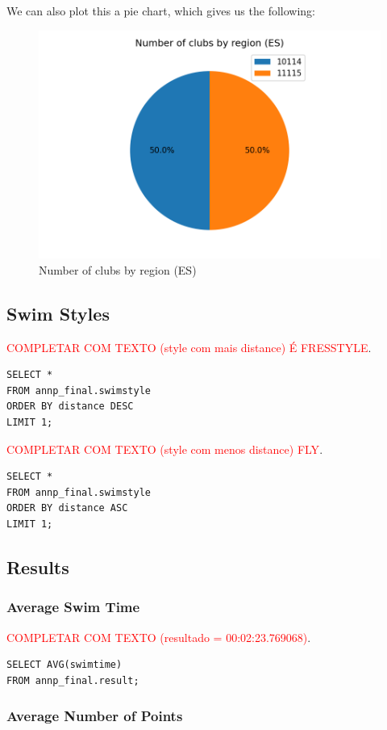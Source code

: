 We can also plot this a pie chart, which gives us the following:

\begin{figure}[H]
    \centering
    \includegraphics[width=.5\textwidth]{img/clubsbyregion-es-pie}
    \caption{Number of clubs by region (ES)}
    \label{fig:clubs-by-region-es-pie}
\end{figure}

\subsection{Swim Styles}

\textcolor{red}{COMPLETAR COM TEXTO (style com mais distance) É FRESSTYLE}.

\begin{verbatim}
SELECT *
FROM annp_final.swimstyle
ORDER BY distance DESC
LIMIT 1;
\end{verbatim}

\textcolor{red}{COMPLETAR COM TEXTO (style com menos distance) FLY}.

\begin{verbatim}
SELECT *
FROM annp_final.swimstyle
ORDER BY distance ASC
LIMIT 1;
\end{verbatim}

\subsection{Results}

\subsubsection{Average Swim Time}

\textcolor{red}{COMPLETAR COM TEXTO (resultado = 00:02:23.769068)}.

\begin{verbatim}
SELECT AVG(swimtime)
FROM annp_final.result;
\end{verbatim}

\subsubsection{Average Number of Points}

